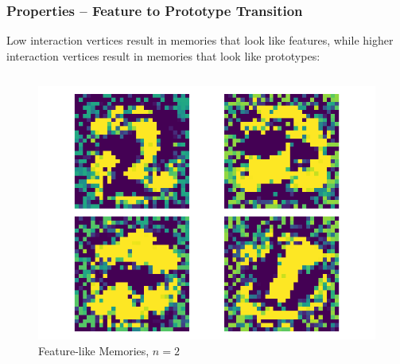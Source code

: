 \begin{frame}
    \frametitle{Properties -- Feature to Prototype Transition}

Low interaction vertices result in memories that look like features, while higher interaction vertices result in memories that look like prototypes:

\begin{columns}
    \begin{figure}
        \includegraphics[width=\textwidth]{images/featureDetector.png}
    \caption{Feature-like Memories, \(n=2\)}
    \end{figure}
\end{columns}
\end{frame}
